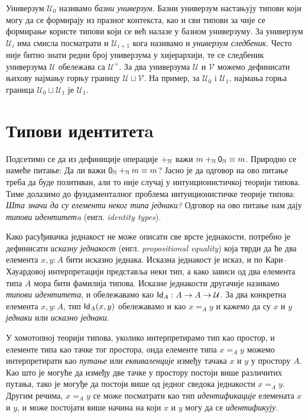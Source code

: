 \documentclass[12pt,oneside]{memoir}
\begin{document}
Универзум $\mathcal{U}_0$ називамо \emph{базни универзум}. Базни универзум настањују типови који могу да се формирају из празног контекста, као и сви типови за чије се формирање користе типови који се већ налазе у базном универзуму. За универзум $\mathcal{U}_i$ има смисла посматрати и $\mathcal{U}_{i+1}$ кога називамо и \emph{универзум следбеник}. Често није битно знати редни број универзума у хијерархији, те се следбеник универзума $\mathcal{U}$ обележава са $\mathcal{U}^{+}$. За два универзума $\mathcal{U}$ и $\mathcal{V}$ можемо дефинисати њихову најмању горњу границу $\mathcal{U} \sqcup \mathcal{V}$. На пример, за $\mathcal{U}_0$ i $\mathcal{U}_1$, најмања горња граница $\mathcal{U}_0 \sqcup \mathcal{U}_1$ је $\mathcal{U}_1$.

\section{Типови идентитетa}

Подсетимо се да из дефиниције операције $+_{\mathbb{N}}$ важи $m +_{\mathbb{N}} \mathsf{0}_\mathbb{N} \equiv m$. Природно се намеће питање: Да ли важи $\mathsf{0}_\mathbb{N} +_{\mathbb{N}} m \equiv m$? Јасно је да одговор на ово питање треба да буде позитиван, али то није случај у интуиционистичкој теорији типова. Тиме долазимо до фундаменталног проблема интуиционистичке теорије типова: \emph{Шта значи да су елементи неког типа једнаки?} Одговор на ово питање нам дају \emph{типови идентитетa} (енгл. \emph{identity types}).

Како расуђивачка једнакост не може описати све врсте једнакости, потребно је дефинисати \emph{исказну једнакост} (енгл. \emph{propositional equality}) која тврди да ће два елемента $x, y : A$ бити исказно једнака. Исказна једнакост је исказ, и по Кари--Хауардовој интерпретацији представља неки тип, а како зависи од два елемента типа $A$ мора бити фамилија типова. Исказне једнакости другачије називамо \emph{типови идентитета}, и обележавамо као $\mathsf{Id}_{A} : A \to A \to
\mathcal{U}$. За два конкретна елемента $x, y : A$, тип $\mathsf{Id}_{A}(x, y)$ обележавамо и као $x =_A y$ и кажемо да су $x$ и $y$ \emph{једнаки} или \emph{исказно једнаки}.

У хомотопној теорији типова, уколико интерпретирамо тип као простор, и елементе типа као тачке тог простора, онда елементе типа $x =_A y$ можемо интерпретирати као \emph{путање} или \emph{еквиваленције} између тачака $x$ и $y$ у простору $A$. Као што је могуће да између две тачке у простору постоји више различитих путања, тако је могуђе да постоји више од једног сведока једнакости $x =_A y$. Другим речима, $x =_A y$ се може посматрати као тип \emph{идентификације} елемената $x$ и $y$, и може постојати више начина на који $x$ и $y$ могу да се \emph{идентификују}. 
\end{document}
